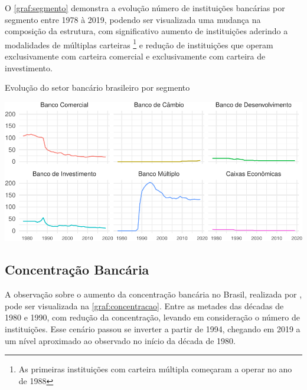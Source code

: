 \documentclass[
  12pt,
  12pt,
  openright,
  oneside,
  a4paper,
  chapter=TITLE,
  section=TITLE,
  subsection=TITLE,
  subsubsection=TITLE,
  english,
  portugues,
  sumario=tradicional]{abntex2}
\begin{document}
O \autoref{graf:segmento} demonstra a evolução número de instituições bancárias por segmento entre 1978 à 2019, podendo ser visualizada uma mudança na composição da estrutura, com significativo aumento de instituições aderindo a modalidades de múltiplas carteiras \footnote{As primeiras instituições com carteira múltipla começaram a operar no ano de 1988} e redução de instituições que operam exclusivamente com carteira comercial e exclusivamente com carteira
de investimento.

\begin{grafico}[!htbp]
\vspace{20pt}
\caption{Evolução do setor bancário brasileiro por segmento}
\vspace{-4mm}

\begin{center}\includegraphics{12-exportedfigures/bank.evolution-1} \end{center}
\vspace{-3mm}
\label{graf:segmento}
\vspace{-2mm}
\end{grafico}

\subsection{Concentração Bancária}

A observação sobre o aumento da concentração bancária no Brasil, realizada por \textcite{camargo:2009}, pode ser visualizada na \autoref{graf:concentracao}. Entre as metades das décadas de 1980 e 1990, com redução da concentração, levando em consideração o número de instituições. Esse cenário passou se inverter a partir de 1994, chegando em 2019 a um nível aproximado ao observado no início da década de 1980.
\end{document}
